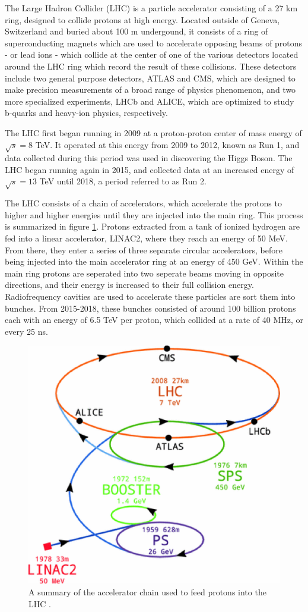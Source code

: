 The Large Hadron Collider (LHC) is a particle accelerator consisting of a 27 km ring, designed to collide protons at high energy. Located outside of Geneva, Switzerland and buried about 100 m undergound, it consists of a ring of superconducting magnets which are used to accelerate opposing beams of protons - or lead ions - which collide at the center of one of the various detectors located around the LHC ring which record the result of these collisions. These detectors include two general purpose detectors, ATLAS and CMS, which are designed to make precision measurements of a broad range of physics phenomenon, and two more specialized experiments, LHCb and ALICE, which are optimized to study b-quarks and heavy-ion physics, respectively.

The LHC first began running in 2009 at a proton-proton center of mass energy of $\sqrt{s} = 8$ TeV. It operated at this energy from 2009 to 2012, known as Run 1, and data collected during this period was used in discovering the Higgs Boson. The LHC began running again in 2015, and collected data at an increased energy of $\sqrt{s} = 13$ TeV until 2018, a period referred to as Run 2. 

The LHC consists of a chain of accelerators, which accelerate the protons to higher and higher energies until they are injected into the main ring. This process is summarized in figure \ref{fig:AccChain}. Protons extracted from a tank of ionized hydrogen are fed into a linear accelerator, LINAC2, where they reach an energy of 50 MeV. From there, they enter a series of three separate circular accelerators, before being injected into the main accelerator ring at an energy of 450 GeV. Within the main ring protons are seperated into two seperate beams moving in opposite directions, and their energy is increased to their full collision energy. Radiofrequency cavities are used to accelerate these particles are sort them into bunches. From 2015-2018, these bunches consisted of around 100 billion protons each with an energy of 6.5 TeV per proton, which collided at a rate of 40 MHz, or every 25 ns. 

\begin{figure}[!htbp]
\centering
   \includegraphics[width=0.75\linewidth]{figures/lhc/AccChain.eps}
\caption{A summary of the accelerator chain used to feed protons into the LHC \cite{}.}
\label{fig:AccChain}
\end{figure}

